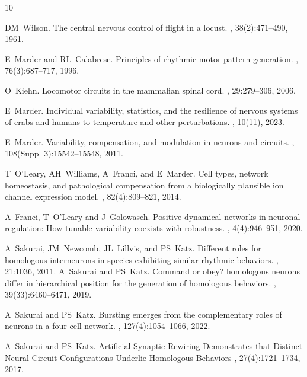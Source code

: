 \documentclass[nofootinbib,aip,amsmath,amssymb,preprint,twocolumn,floatfix,10pt]{revtex4-2}
\begin{document}
\begin{thebibliography}{10}

  
DM~Wilson.
\newblock The central nervous control of flight in a locust.
, 38(2):471--490, 1961.

E~Marder and RL~Calabrese.
\newblock Principles of rhythmic motor pattern generation.
, {76}({3}):687--717, {1996}.

O~Kiehn.
\newblock Locomotor circuits in the mammalian spinal cord.
, 29:279--306, 2006.

E~Marder.
\newblock Individual variability, statistics, and the resilience of nervous systems of crabs and humans to temperature and other perturbations.
, 10(11), 2023.

E~Marder.
\newblock Variability, compensation, and modulation in neurons and circuits.
, 108(Suppl 3):15542--15548, 2011.

T~O'Leary, AH~Williams, A~Franci, and E~Marder.
\newblock Cell types, network homeostasis, and pathological compensation from a biologically plausible ion channel expression model.
, 82(4):809--821, 2014.

A~Franci, T~O'Leary  and J~Golowasch.
\newblock Positive dynamical networks in neuronal regulation: How tunable variability coexists with robustness.
, 4(4):946--951, 2020.


A~Sakurai, JM~Newcomb, JL~Lillvis, and PS~Katz.
\newblock Different roles for homologous interneurons in species exhibiting
  similar rhythmic behaviors.
, 21:1036, 2011.
A~Sakurai and PS~Katz.
\newblock Command or obey? homologous neurons differ in hierarchical position
  for the generation of homologous behaviors.
, 39(33):6460--6471, 2019.

A~Sakurai and PS~Katz.
\newblock Bursting emerges from the complementary roles of neurons in a
  four-cell network.
, 127(4):1054--1066, 2022.

A~Sakurai and PS~Katz.
\newblock Artificial Synaptic Rewiring Demonstrates that Distinct Neural Circuit Configurations
Underlie Homologous Behaviors , 27(4):1721--1734, 2017.



\end{thebibliography}
\end{document}
